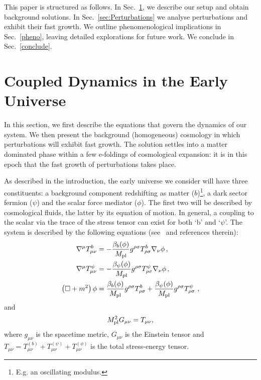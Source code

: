 \documentclass[a4paper, amsfonts, amssymb, amsmath, reprint, showkeys, nofootinbib, twoside, superscriptaddress]{revtex4-1}
\begin{document}
This paper is structured as follows. In Sec.~\ref{background}, we describe our setup and obtain background solutions.
In Sec.~\ref{sec:Perturbations} we analyse perturbations and exhibit their fast growth. We outline phenomenological implications
in Sec.~\ref{pheno}, leaving detailed explorations for future work. We conclude in Sec.~\ref{conclude}.

\section{Coupled  Dynamics in the Early Universe}
\label{background}

In this section, we first describe the equations that govern the dynamics of our system. We then present the background (homogeneous) cosmology in which perturbations will exhibit fast growth.  The solution settles into a matter dominated phase within a few e-foldings of cosmological expansion: it is in this epoch that the fast growth of perturbations takes place.

As described in the introduction, the early universe we consider will have three constituents: a background component redshifting as matter ($b$)\footnote{E.g. an oscillating modulus.}, a dark sector fermion ($\psi$) and the scalar force mediator ($\phi$). The first two will be described by cosmological fluids, the latter by its equation of motion. In general, a coupling to the scalar via the trace of the stress tensor can exist for both `b' and `$\psi$'. The system is described by the following equations (see~\cite{Amendola:2003wa} and references therein):
%
\begin{align}
\label{eq:GeneralConservationBackground}
 \nabla^{\mu} T_{\mu \nu}^{b} &= - {\beta_{b}(\phi) \over M_{\rm pl} } g^{\rho \sigma} T_{\rho \sigma}^{b} \nabla_{\nu} \phi \,, \\
 \label{eq:GeneralConservationPsi}
 \nabla^{\mu} T_{\mu \nu}^{\psi} &= - {\beta_{\psi}(\phi) \over M_{\rm pl}}g^{\rho \sigma} T_{\rho \sigma}^{\psi} \nabla_{\nu} \phi \,, \\
 \label{eq:GeneralKGEquation}
 \left( \square  + m^{2} \right) \phi &=   {\beta_{b}(\phi) \over M_{\rm pl}} g^{\rho \sigma} T_{\rho \sigma}^{b} + {\beta_{\psi}(\phi) \over M_{\rm pl}} g^{\rho \sigma} T_{\rho \sigma}^{\psi} \ ,
\end{align}
%
 and
 \begin{equation}
 \label{eq:Einstein}
  M_{\rm pl}^{2}  G_{\mu \nu} =  T_{\mu \nu},
\end{equation}
%
where $g_{\mu \nu}$ is the spacetime metric, $G_{\mu \nu}$ is the Einstein tensor and $T_{\mu \nu} = T_{\mu \nu}^{(b)} + T_{\mu \nu}^{(\psi)} + T^{(\phi)}_{\mu \nu}$ is the total stress-energy tensor. 
\end{document}
